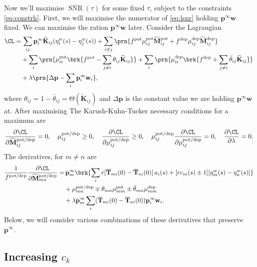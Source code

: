 \documentclass[12pt]{article}
\newcommand{\pr}{\mathbf{p}}
\newcommand{\eq}{\pr^\infty}
\newcommand{\fpt}{\mathbf{T}}
\newcommand{\fptb}{\overline{\fpt}}
\newcommand{\w}{\mathbf{w}}
\newcommand{\M}{\mathbf{M}}
\newcommand{\enc}{\mathbf{K}}
\newcommand{\pot}{^{\text{pot}}}
\newcommand{\dep}{^{\text{dep}}}
\newcommand{\potdep}{^{\text{pot/dep}}}
\newcommand{\Mh}{\widetilde{\M}}
\newcommand{\ench}{\widetilde{\enc}}
\DeclareMathOperator{\snr}{SNR}
\newcommand{\snrb}{\overline{\snr}}
\renewcommand{\pdiff}[2]{\frac{\partial #1}{\partial #2}}
\begin{document}
Now we'll maximise $\snrb(\tau)$ for some fixed $\tau$, subject to the constraints \eqref{eq:constrh}.
First, we will maximise the numerator of \eqref{eq:lsnr} holding $\eq\w$ fixed.
We can maximise the ration \wrt $\eq\w$ later.
Consider the Lagrangian
%
\begin{equation}\label{eq:finitelagrangian}
\begin{aligned}
  \CL =&\, \sum_{ij} \eq_i \ench_{ij} (\eta^w_i(s) - \eta^w_j(s))
        +\sum_{i\neq j} \prn{ f\pot\mu\pot_{ij} \Mh\pot_{ij} + f\dep\mu\dep_{ij} \Mh\dep_{ij} }\\
        &+\sum_i \prn{ \mu\pot_{ii} \brk{ f\pot - \sum_{j\neq i} \theta_{ij} \ench_{ij} } }
        +\sum_i \prn{ \mu\dep_{ii} \brk{ f\dep + \sum_{j\neq i} \bar{\theta}_{ij} \ench_{ij} } } \\
        &+ \lambda \prn{ \Delta\pr - \sum_i \eq_i\w_i },
\end{aligned}
\end{equation}
%
where $\theta_{ij} = 1-\bar{\theta}_{ij} = \Theta(\ench_{ij})$ and $\Delta\pr$ is the constant value we are holding $\eq\w$ at.
After maximising
The Karush-Kuhn-Tucker necessary conditions for a maximum are
%
\begin{equation}\label{eq:KTfinite}
  \pdiff{\CL}{\Mh\potdep_{ij}} = 0, \quad
  \mu\potdep_{ij} \geq 0, \quad
  \pdiff{\CL}{\mu\potdep_{ij}} \geq 0, \quad
  \mu\potdep_{ij}\pdiff{\CL}{\mu\potdep_{ij}} = 0, \quad
  \pdiff{\CL}{\lambda} = 0.
\end{equation}
%
The derivatives, for $m \neq n$ are
%
\begin{equation}\label{eq:finitederivs}
\begin{aligned}
  \frac{1}{f\potdep} \pdiff{\CL}{\Mh\potdep_{mn}} =& \,
     \eq_m \brk{ \sum_i r[\fptb_{mi}(0)-\fptb_{ni}(0)]\, a_i(s)
     +[rc_m(s) \pm 1] [\eta^w_m(s) - \eta^w_n(s)] } \\
     &+ \mu\potdep_{mn} \mp  \theta_{mn} \mu\pot_{mm} \pm  \bar{\theta}_{mn} \mu\dep_{mm} \\
     &+ \lambda \eq_m \sum_i (\fptb_{mi}(0)-\fptb_{ni}(0)) \eq_i\w_i.
\end{aligned}
\end{equation}
%
Below, we will consider various combinations of these derivatives that preserve $\eq$.

\subsection{Increasing \texorpdfstring{$c_k$}{c(k)}}\label{sec:areacoeffincr}
\end{document}
